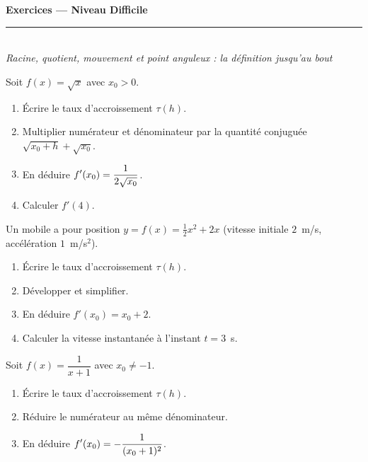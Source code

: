 \pagestyle{fancy}\fancyhf{}
\fancyfoot[C]{\small\thepage}
\renewcommand{\headrulewidth}{0.8pt}



\begin{center}
{\LARGE\bfseries\color{primarydark} Exercices — Niveau Difficile}\\[2pt]
{\color{primary}\rule{0.5\textwidth}{1.2pt}}\\[4pt]
{\small\itshape Racine, quotient, mouvement et point anguleux : la définition jusqu'au bout}
\end{center}
\vspace{2mm}

\begin{exo}
Soit $f(x)=\sqrt{x}$ avec $x_0>0$.
\begin{enumerate}[label=\alph*),leftmargin=7mm,itemsep=1pt]
  \item Écrire le taux d'accroissement $\tau(h)$.
  \item Multiplier numérateur et dénominateur par la quantité conjuguée
        $\sqrt{x_0+h}+\sqrt{x_0}$.
  \item En déduire $\displaystyle f'(x_0)=\frac{1}{2\sqrt{x_0}}$.
  \item Calculer $f'(4)$.
\end{enumerate}
\end{exo}

\begin{exo}
Un mobile a pour position $y=f(x)=\tfrac{1}{2}x^2+2x$ (vitesse initiale $2$~m/s,
accélération $1$~m/s$^2$).
\begin{enumerate}[label=\alph*),leftmargin=7mm,itemsep=1pt]
  \item Écrire le taux d'accroissement $\tau(h)$.
  \item Développer et simplifier.
  \item En déduire $f'(x_0)=x_0+2$.
  \item Calculer la vitesse instantanée à l'instant $t=3$~s.
\end{enumerate}
\end{exo}

\begin{exo}
Soit $f(x)=\dfrac{1}{x+1}$ avec $x_0\neq -1$.
\begin{enumerate}[label=\alph*),leftmargin=7mm,itemsep=1pt]
  \item Écrire le taux d'accroissement $\tau(h)$.
  \item Réduire le numérateur au même dénominateur.
  \item En déduire $\displaystyle f'(x_0)=-\frac{1}{(x_0+1)^2}$.
\end{enumerate}
\end{exo}

